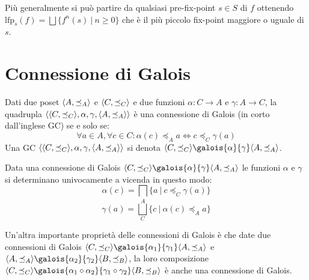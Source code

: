 Più generalmente si può partire da qualsiasi pre-fix-point \(s\in S\) di \(f\) ottenendo \(\textrm{lfp}_s(f)=\bigsqcup\{f^n(s)\ |\ n\geq 0\}\) che è il più piccolo fix-point maggiore o uguale di \(s\).

\section{Connessione di Galois}

\begin{definition}
Dati due poset \(\langle A, \preceq_{A}\rangle\) e \(\langle C, \preceq_{C}\rangle\) e due funzioni \(\alpha:C\rightarrow A\) e \(\gamma:A\rightarrow C\), la quadrupla \(\langle \langle C, \preceq_{C}\rangle, \alpha, \gamma, \langle A, \preceq_{A}\rangle\rangle\) è una connessione di Galois (in corto dall'inglese GC) se e solo se:
\[\forall a\in A, \forall c\in C: \alpha(c)\preceq_A a \Leftrightarrow c\preceq_C \gamma(a)\]
Una GC \(\langle \langle C, \preceq_{C}\rangle, \alpha, \gamma, \langle A, \preceq_{A}\rangle\rangle\) si denota \(\simplePoset{C}\galois{\alpha}{\gamma}\simplePoset{A}\).
\end{definition}

Data una connessione di Galois \(\simplePoset{C}\galois{\alpha}{\gamma}\simplePoset{A}\) le funzioni \(\alpha\) e \(\gamma\) si determinano univocamente a vicenda in questo modo:
\[\alpha(c) = \bigsqcap_A\{a\ |\ c\preceq_C \gamma(a)\}\]
\[\gamma(a) = \bigsqcup_C\{c\ |\ \alpha(c)\preceq_A a\}\]

Un'altra importante proprietà delle connessioni di Galois è che date due connessioni di Galois \(\simplePoset{C}\galois{\alpha_1}{\gamma_1}\simplePoset{A}\) e \(\simplePoset{A}\galois{\alpha_2}{\gamma_2}\simplePoset{B}\), la loro composizione \(\simplePoset{C}\galois{\alpha_1\circ\alpha_2}{\gamma_1\circ\gamma_2}\simplePoset{B}\) è anche una connessione di Galois.

